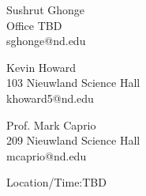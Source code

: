 \documentclass[12pt]{mcplain}
\begin{document}


\begin{multicols}{3}

Sushrut Ghonge\\
Office TBD\\
sghonge@nd.edu

\columnbreak
Kevin Howard\\
103 Nieuwland Science Hall\\
khoward5@nd.edu

\columnbreak

Prof. Mark Caprio\\
209 Nieuwland Science Hall\\
mcaprio@nd.edu
\end{multicols}


\syllabusseparator


\begin{leftindent}
 Location/Time:TBD %
\end{leftindent}


%
%
%
\end{document}
